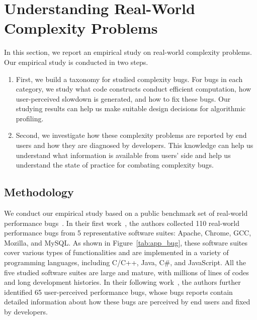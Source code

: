 \section{Understanding Real-World Complexity Problems}
\label{sec:study}

In this section, we report an empirical study on real-world 
complexity problems. Our empirical study is conducted in two steps.

\begin{enumerate}

\item First, we build a taxonomy for studied complexity bugs. 
For bugs in each category, 
we study what code constructs conduct efficient computation,
how user-perceived slowdown is generated, and how to fix these bugs. 
Our studying results can help us 
make suitable design decisions for algorithmic profiling. 

\item Second, we investigate how these complexity problems are reported by end users
and how they are diagnosed by developers. 
This knowledge can help us understand what information is available from users' side
and help us understand the 
state of practice for combating complexity bugs.


\end{enumerate}

\subsection{Methodology}
\label{sec:meth}



We conduct our empirical study based on a public benchmark set of 
real-world performance bugs~\cite{PerfBug,SongOOPSLA2014}. 
In their first work~\cite{PerfBug}, 
the authors collected 110 real-world performance bugs from 5 representative 
software suites: Apache, Chrome, GCC, Mozilla, and MySQL. 
As shown in Figure~\ref{tab:app_bug}, 
these software suites cover various types of functionalities and are implemented 
in a variety of programming languages, including C/C++, Java, C\#, and JavaScript. 
All the five studied software suites are large and mature, 
with millions of lines of codes and long development histories. 
In their following work~\cite{SongOOPSLA2014}, 
the authors further identified 65 user-perceived performance bugs, 
whose bugs reports contain detailed information 
about how these bugs are perceived by end users and fixed by developers.  

